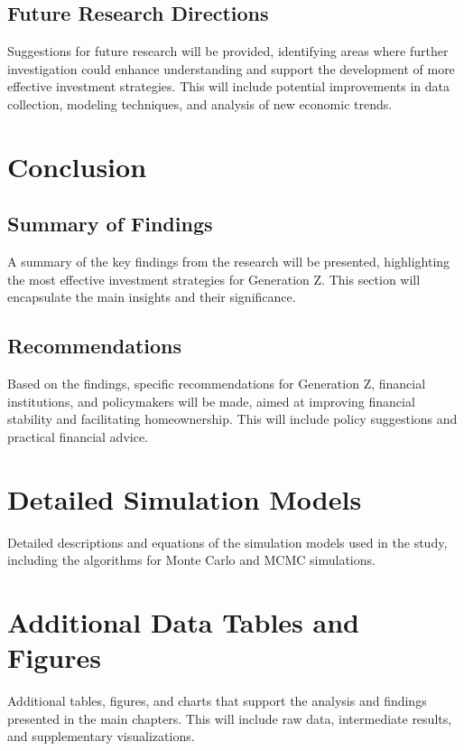 \documentclass[12pt]{report}
\begin{document}
\section{Future Research Directions}
Suggestions for future research will be provided, identifying areas where further investigation could enhance understanding and support the development of more effective investment strategies. This will include potential improvements in data collection, modeling techniques, and analysis of new economic trends.

\chapter{Conclusion}
\section{Summary of Findings}
A summary of the key findings from the research will be presented, highlighting the most effective investment strategies for Generation Z. This section will encapsulate the main insights and their significance.

\section{Recommendations}
Based on the findings, specific recommendations for Generation Z, financial institutions, and policymakers will be made, aimed at improving financial stability and facilitating homeownership. This will include policy suggestions and practical financial advice.

\begin{thebibliography}{99}


\end{thebibliography}

\appendix
\chapter{Detailed Simulation Models}
Detailed descriptions and equations of the simulation models used in the study, including the algorithms for Monte Carlo and MCMC simulations.

\chapter{Additional Data Tables and Figures}
Additional tables, figures, and charts that support the analysis and findings presented in the main chapters. This will include raw data, intermediate results, and supplementary visualizations.
\end{document}
